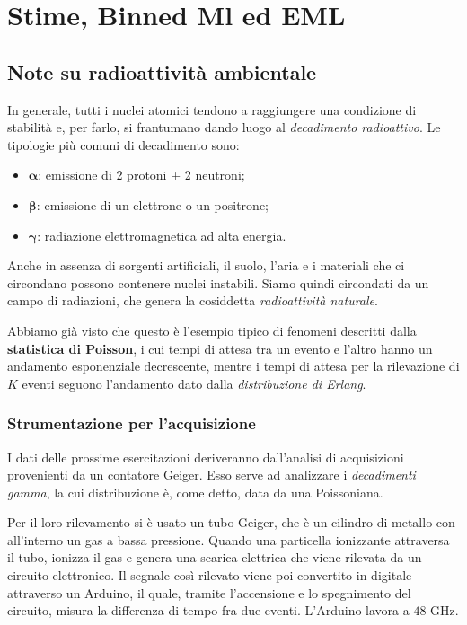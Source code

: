 \documentclass[openany,a4paper,12pt]{book}
\theoremstyle{remark}
\begin{document}
\section{Stime, Binned Ml ed EML}

\subsection*{Note su radioattività ambientale}
In generale, tutti i nuclei atomici tendono a raggiungere una condizione di stabilità e, per farlo, si frantumano dando luogo al \textit{decadimento radioattivo}. Le tipologie più comuni di decadimento sono:
\begin{itemize}
    \item $\boldsymbol{\alpha}$: emissione di 2 protoni + 2 neutroni;
    \item $\boldsymbol{\beta}$: emissione di un elettrone o un positrone;
    \item $\boldsymbol{\gamma}$: radiazione elettromagnetica ad alta energia.
\end{itemize}
Anche in assenza di sorgenti artificiali, il suolo, l'aria e i materiali che ci circondano possono contenere nuclei instabili. Siamo quindi circondati da un campo di radiazioni, che genera la cosiddetta \textit{radioattività naturale}.

Abbiamo già visto che questo è l'esempio tipico di fenomeni descritti dalla \textbf{statistica di Poisson}, i cui tempi di attesa tra un evento e l'altro hanno un andamento esponenziale decrescente, mentre i tempi di attesa per la rilevazione di $K$ eventi seguono l'andamento dato dalla \textit{distribuzione di Erlang}.

\subsubsection*{Strumentazione per l'acquisizione}
I dati delle prossime esercitazioni deriveranno dall'analisi di acquisizioni provenienti da un contatore Geiger. Esso serve ad analizzare i \textit{decadimenti gamma}, la cui distribuzione è, come detto, data da una Poissoniana.

Per il loro rilevamento si è usato un tubo Geiger, che è un cilindro di metallo con all'interno un gas a bassa pressione. Quando una particella ionizzante attraversa il tubo, ionizza il gas e genera una scarica elettrica che viene rilevata da un circuito elettronico. Il segnale così rilevato viene poi convertito in digitale attraverso un Arduino, il quale, tramite l'accensione e lo spegnimento del circuito, misura la differenza di tempo fra due eventi. L'Arduino lavora a $48\text{ GHz}$.
\end{document}
